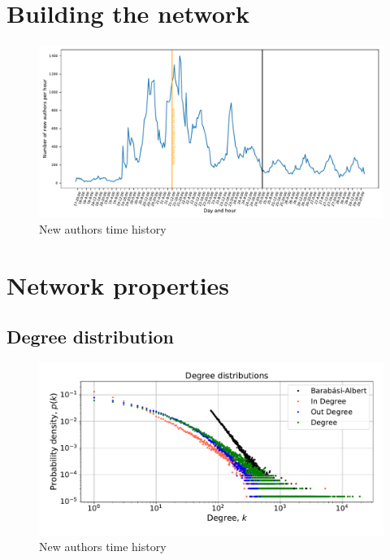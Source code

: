 \documentclass[12pt, twoside]{report}
\begin{document}
    \chapter{Building the network}

    \begin{figure}[htbp]
      \centering
\includegraphics[width=\textwidth]{../../scripts/visualization/imgs/time_history.pdf}            
      \caption{New authors time history}
      \label{fig:time_history}
    \end{figure}

    
    \chapter{Network properties}

 \section{Degree distribution}    
    \begin{figure}[htbp]
      \centering
      \includegraphics[width=\textwidth]{../../scripts/visualization/imgs/degree_distributions.pdf}            
      \caption{New authors time history}
      \label{fig:degree}
    \end{figure}
\end{document}
